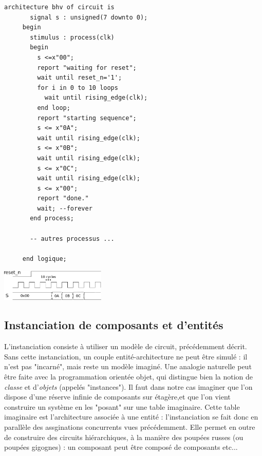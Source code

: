 \begin{center}
   \begin{minipage}[t]{9cm}
     \vspace{0pt}
     \begin{lstlisting}[frame=single]
     architecture bhv of circuit is
       signal s : unsigned(7 downto 0);
     begin
       stimulus : process(clk)
       begin
         s <=x"00";
         report "waiting for reset";
         wait until reset_n='1';
         for i in 0 to 10 loops
           wait until rising_edge(clk);
         end loop;
         report "starting sequence";
         s <= x"0A";
         wait until rising_edge(clk);
         s <= x"0B";
         wait until rising_edge(clk);
         s <= x"0C";
         wait until rising_edge(clk);
         s <= x"00";
         report "done."
         wait; --forever
       end process;

       -- autres processus ...

     end logique;
     \end{lstlisting}
  \end{minipage}%
  \begin{minipage}[t]{6cm}
   \vspace{40pt}
   \centering
   \includegraphics[width=5cm]{./figures/chronogramme.png}
  \end{minipage}
  \end{center} %
\subsection{Instanciation de composants et d'entités}
L'instanciation consiste à utiliser un modèle de circuit, précédemment décrit. Sans cette instanciation, un couple entité-architecture ne peut être simulé : il n'est pas "incarné", mais reste un modèle imaginé.
Une analogie naturelle peut être faite avec la programmation orientée objet, qui distingue bien la notion de {\it classe} et d'{\it objets} (appelés "instances"). Il faut dans notre cas imaginer
que l'on dispose d'une réserve infinie de composants sur étagère,et que l'on vient construire un système en les "posant" sur une table imaginaire. Cette table imaginaire est l'architecture associée à une entité :
l'instanciation se fait donc en parallèle des assginations concurrents vues précédemment. Elle permet en outre de construire des circuits hiérarchiques, à la manière des poupées russes (ou poupées gigognes) : un composant
peut être composé de composants etc...

